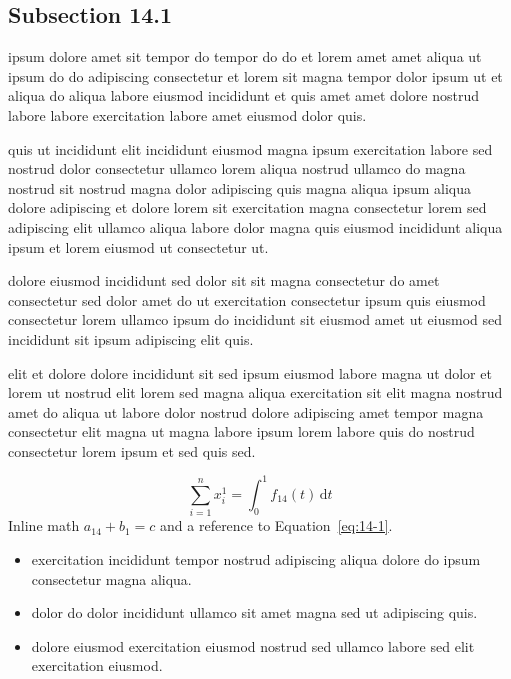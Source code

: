 \documentclass{article}
\begin{document}
\subsection{Subsection 14.1}\label{sec:14-1}
ipsum dolore amet sit tempor do tempor do do et lorem amet amet aliqua ut ipsum do do adipiscing consectetur et lorem sit magna tempor dolor ipsum ut et aliqua do aliqua labore eiusmod incididunt et quis amet amet dolore nostrud labore labore exercitation labore amet eiusmod dolor quis.

quis ut incididunt elit incididunt eiusmod magna ipsum exercitation labore sed nostrud dolor consectetur ullamco lorem aliqua nostrud ullamco do magna nostrud sit nostrud magna dolor adipiscing quis magna aliqua ipsum aliqua dolore adipiscing et dolore lorem sit exercitation magna consectetur lorem sed adipiscing elit ullamco aliqua labore dolor magna quis eiusmod incididunt aliqua ipsum et lorem eiusmod ut consectetur ut.

dolore eiusmod incididunt sed dolor sit sit magna consectetur do amet consectetur sed dolor amet do ut exercitation consectetur ipsum quis eiusmod consectetur lorem ullamco ipsum do incididunt sit eiusmod amet ut eiusmod sed incididunt sit ipsum adipiscing elit quis.

elit et dolore dolore incididunt sit sed ipsum eiusmod labore magna ut dolor et lorem ut nostrud elit lorem sed magna aliqua exercitation sit elit magna nostrud amet do aliqua ut labore dolor nostrud dolore adipiscing amet tempor magna consectetur elit magna ut magna labore ipsum lorem labore quis do nostrud consectetur lorem ipsum et sed quis sed.

\begin{equation}\label{eq:14-1}
  \sum_{i=1}^{n} x_i^{1} = \int_0^1 f_{14}(t)\,\mathrm{d}t
\end{equation}
Inline math $a_{14} + b_{1} = c$ and a reference to Equation~\eqref{eq:14-1}.

\begin{itemize}
  \item exercitation incididunt tempor nostrud adipiscing aliqua dolore do ipsum consectetur magna aliqua.
  \item dolor do dolor incididunt ullamco sit amet magna sed ut adipiscing quis.
  \item dolore eiusmod exercitation eiusmod nostrud sed ullamco labore sed elit exercitation eiusmod.
\end{itemize}
\end{document}
